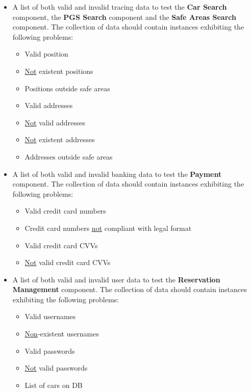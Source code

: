 \documentclass[english]{article}
\begin{document}
\begin{itemize}
     \item{A list of both valid and invalid tracing data to test the \textbf{Car Search} component, the \textbf{PGS Search} component and the \textbf{Safe Areas Search} component.
     The collection of data should contain instances exhibiting the following problems:
     \begin{itemize}
       \item{Valid position}
       \item{\underline{Not} existent positions}
       \item{Positions outside safe areas}
       \item{Valid addresses}
       \item{\underline{Not} valid addresses}
       \item{\underline{Not} existent addresses}
       \item{Addresses outside safe areas}
     \end{itemize}}
 
     \item{A list of both valid and invalid banking data to test the \textbf{Payment} component.
     The collection of data should contain instances exhibiting the following problems:
     \begin{itemize}
       \item{Valid credit card numbers}
       \item{Credit card numbers \underline{not} compliant with legal format}
       \item{Valid credit card CVVs}
       \item{\underline{Not} valid credit card CVVs}
     \end{itemize}}
 
     \item{A list of both valid and invalid user data to test the \textbf{Reservation Management} component.
     The collection of data should contain instances exhibiting the following problems:
     \begin{itemize}
       \item{Valid usernames}
       \item{\underline{Non}-existent usernames}
       \item{Valid passwords}
       \item{\underline{Not} valid passwords}
       \item{List of cars on DB}
     \end{itemize}}
 

\end{itemize}
\end{document}
